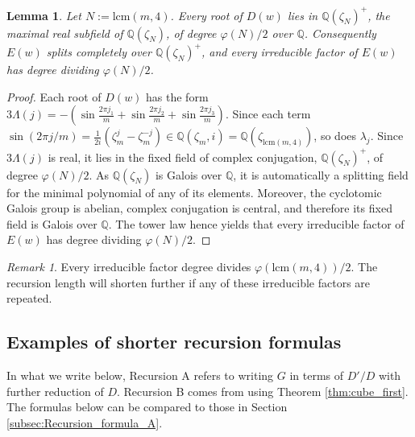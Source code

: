 \documentclass[11pt,reqno]{amsart}
\newtheorem{lemma}[theorem]{Lemma}
\theoremstyle{remark}
\newtheorem{remark}[theorem]{Remark}
\begin{document}
\begin{lemma}
\label{prop:cyclotomic-field}
Let $N:=\mathrm{lcm}(m,4)$. Every root of $D(w)$ lies in
$\mathbb Q(\zeta_N)^+$, the maximal real subfield of $\mathbb Q(\zeta_N)$,
of degree $\varphi(N)/2$ over $\mathbb Q$. Consequently $E(w)$ splits
completely over $\mathbb Q(\zeta_N)^+$, and every irreducible factor of
$E(w)$ has degree dividing $\varphi(N)/2$.
\end{lemma}

\begin{proof}
Each root of $D(w)$ has the form
$3\Lambda(j)=-(\sin\tfrac{2\pi j_1}{m}+\sin\tfrac{2\pi j_2}{m}+\sin\tfrac{2\pi j_3}{m})$.
Since
each term $\sin(2\pi j/m)=\tfrac{1}{2i}(\zeta_m^j-\zeta_m^{-j})\in\mathbb Q(\zeta_m,i)=\mathbb Q(\zeta_{\mathrm{lcm}(m,4)})$,
so does $\lambda_{j}$. Since
$3\Lambda(j)$ is real, it lies in the fixed field of complex
conjugation, $\mathbb Q(\zeta_N)^+$, of degree $\varphi(N)/2$. As  $\mathbb Q(\zeta_N)$ is Galois over  $\mathbb Q$, it is automatically a splitting field for the minimal polynomial of any of its elements. Moreover, the cyclotomic Galois group is abelian, complex conjugation is central, and therefore its fixed field is Galois over  $\mathbb Q$.  The tower law hence yields that every irreducible factor of
$E(w)$ has degree dividing $\varphi(N)/2$.
\end{proof}

\begin{remark}
Every irreducible factor degree divides $\varphi(\mathrm{lcm}(m,4))/2$. The recursion length will shorten further if any of these irreducible factors are repeated.
\end{remark}



\subsection{Examples of shorter recursion formulas}

In what we write below, Recursion A refers to writing $G$ in terms of $D'/D$ with
further reduction of $D$. Recursion B comes from using Theorem \ref{thm:cube_first}. The formulas
below can be compared to those in Section \ref{subsec:Recursion_formula_A}.

\end{document}
